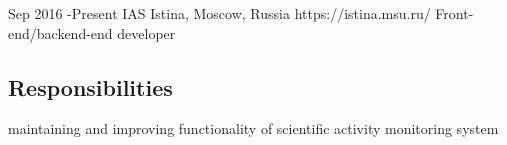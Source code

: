 \documentclass[10pt]{article} %
\begin{document}

\job
{Sep 2016 -}{Present}
{IAS Istina, Moscow, Russia}
{https://istina.msu.ru/}
{Front-end/backend-end developer}
{

%


\begin{itemize-noindent}
\subsection{Responsibilities}
\item{maintaining and improving functionality of scientific activity monitoring system}


\end{itemize-noindent}}
\end{document}
